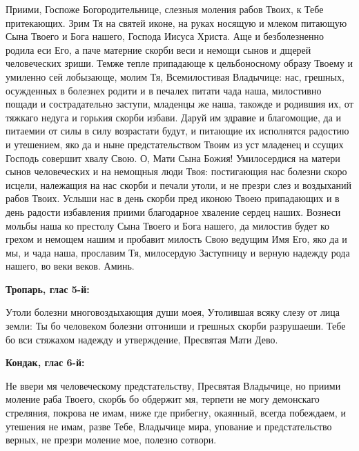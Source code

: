 Приими, Госпоже Богородительнице, слезныя моления рабов Твоих, к Тебе притекающих. Зрим Тя на святей иконе, на руках носящую и млеком питающую Сына Твоего и Бога нашего, Господа Иисуса Христа. Аще и безболезненно родила еси Его, а паче матерние скорби веси и немощи сынов и дщерей человеческих зриши. Темже тепле припадающе к цельбоносному образу Твоему и умиленно сей лобызающе, молим Тя, Всемилостивая Владычице: нас, грешных, осужденных в болезнех родити и в печалех питати чада наша, милостивно пощади и сострадательно заступи, младенцы же наша, такожде и родившия их, от тяжкаго недуга и горькия скорби избави. Даруй им здравие и благомощие, да и питаемии от силы в силу возрастати будут, и питающие их исполнятся радостию и утешением, яко да и ныне предстательством Твоим из уст младенец и ссущих Господь совершит хвалу Свою. О, Мати Сына Божия! Умилосердися на матери сынов человеческих и на немощныя люди Твоя: постигающия нас болезни скоро исцели, належащия на нас скорби и печали утоли, и не презри слез и воздыханий рабов Твоих. Услыши нас в день скорби пред иконою Твоею припадающих и в день радости избавления приими благодарное хваление сердец наших. Вознеси мольбы наша ко престолу Сына Твоего и Бога нашего, да милостив будет ко грехом и немощем нашим и пробавит милость Свою ведущим Имя Его, яко да и мы, и чада наша, прославим Тя, милосердую Заступницу и верную надежду рода нашего, во веки веков. Аминь.


\bigskip\bigskip\mychapterending

 


\bfseries Тропарь, глас 5-й:\normalfont{}\nopagebreak


Утоли болезни многовоздыхающия души моея, Утолившая всяку слезу от лица земли: Ты бо человеком болезни отгониши и грешных скорби разрушаеши. Тебе бо вси стяжахом надежду и утверждение, Пресвятая Мати Дево.


\medskip


\bfseries Кондак, глас 6-й:\normalfont{}\nopagebreak


Не ввери мя человеческому предстательству, Пресвятая Владычице, но приими моление раба Твоего, скорбь бо обдержит мя, терпети не могу демонскаго стреляния, покрова не имам, ниже где прибегну, окаянный, всегда побеждаем, и утешения не имам, разве Тебе, Владычице мира, упование и предстательство верных, не презри моление мое, полезно сотвори.



